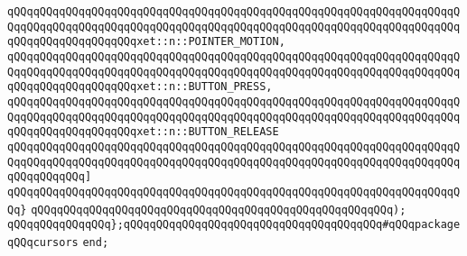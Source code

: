 \verb|qQQqqQQqqQQqqQQqqQQqqQQqqQQqqQQqqQQqqQQqqQQqqQQqqQQqqQQqqQQqqQQqqQQqqQQqqQQqqQQqqQQqqQQqqQQqqQQqqQQqqQQqqQQqqQQqqQQqqQQqqQQqqQQqqQQqqQQqqQQqqQQqqQQqqQQqqQQqqQQqxet::n::POINTER_MOTION,|\newline
\verb|qQQqqQQqqQQqqQQqqQQqqQQqqQQqqQQqqQQqqQQqqQQqqQQqqQQqqQQqqQQqqQQqqQQqqQQqqQQqqQQqqQQqqQQqqQQqqQQqqQQqqQQqqQQqqQQqqQQqqQQqqQQqqQQqqQQqqQQqqQQqqQQqqQQqqQQqqQQqqQQqxet::n::BUTTON_PRESS,|\newline
\verb|qQQqqQQqqQQqqQQqqQQqqQQqqQQqqQQqqQQqqQQqqQQqqQQqqQQqqQQqqQQqqQQqqQQqqQQqqQQqqQQqqQQqqQQqqQQqqQQqqQQqqQQqqQQqqQQqqQQqqQQqqQQqqQQqqQQqqQQqqQQqqQQqqQQqqQQqqQQqqQQqxet::n::BUTTON_RELEASE|\newline
\verb|qQQqqQQqqQQqqQQqqQQqqQQqqQQqqQQqqQQqqQQqqQQqqQQqqQQqqQQqqQQqqQQqqQQqqQQqqQQqqQQqqQQqqQQqqQQqqQQqqQQqqQQqqQQqqQQqqQQqqQQqqQQqqQQqqQQqqQQqqQQqqQQqqQQqqQQq]|\newline
\verb|qQQqqQQqqQQqqQQqqQQqqQQqqQQqqQQqqQQqqQQqqQQqqQQqqQQqqQQqqQQqqQQqqQQqqQQq}|\newline
\verb|qQQqqQQqqQQqqQQqqQQqqQQqqQQqqQQqqQQqqQQqqQQqqQQqqQQqqQQq);|\newline
\newline
\verb|qQQqqQQqqQQqqQQq};qQQqqQQqqQQqqQQqqQQqqQQqqQQqqQQqqQQqqQQq#qQQqpackageqQQqcursors|\newline
\newline
\verb|end;|\newline
\newline

